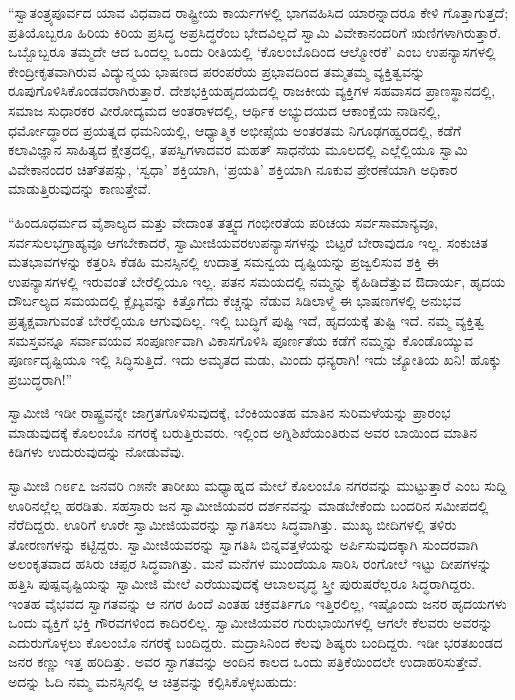  “ಸ್ವಾತಂತ್ರ್ಯಪೂರ್ವದ ಯಾವ ವಿಧವಾದ ರಾಷ್ಟ್ರೀಯ ಕಾರ್ಯಗಳಲ್ಲಿ ಭಾಗವಹಿಸಿದ ಯಾರನ್ನಾದರೂ ಕೇಳಿ ಗೊತ್ತಾಗುತ್ತದೆ; ಪ್ರತಿಯೊಬ್ಬರೂ ಹಿರಿಯ ಕಿರಿಯ ಪ್ರಸಿದ್ಧ ಅಪ್ರಸಿದ್ಧರೆಂಬ ಭೇದವಿಲ್ಲದೆ ಸ್ವಾಮಿ ವಿವೇಕಾನಂದರಿಗೆ ಋಣಿಗಳಾಗಿರುತ್ತಾರೆ. ಒಬ್ಬೊಬ್ಬರೂ ತಮ್ಮದೇ ಆದ ಒಂದಲ್ಲ ಒಂದು ರೀತಿಯಲ್ಲಿ ‘ಕೊಲಂಬೊದಿಂದ ಆಲ್ಮೋರಕೆ’ ಎಂಬ ಉಪನ್ಯಾಸಗಳಲ್ಲಿ ಕೇಂದ್ರೀಕೃತವಾಗಿರುವ ವಿದ್ಯುನ್ಮಯ ಭಾಷಣದ ಪರಂಪರೆಯ ಪ್ರಭಾವದಿಂದ ತಮ್ಮತಮ್ಮ ವ್ಯಕ್ತಿತ್ವವನ್ನು ರೂಪುಗೊಳಿಸಿಕೊಂಡವರಾಗಿರುತ್ತಾರೆ. ದೇಶಭಕ್ತಿಯ\break ಹೃದಯದಲ್ಲಿ ರಾಜಕೀಯ ವ್ಯಕ್ತಿಗಳ ಸಹವಾಸದ ಪ್ರಾಣಸ್ಥಾನದಲ್ಲಿ, ಸಮಾಜ ಸುಧಾರಕರ ವೀರೋದ್ಯಮದ ಅಂತರಾಳದಲ್ಲಿ, ಆರ್ಥಿಕ ಅಭ್ಯುದಯದ ಆಕಾಂಕ್ಷೆಯ ನಾಡಿನಲ್ಲಿ, ಧರ್ಮೋದ್ಧಾರದ ಪ್ರಯತ್ನದ ಧಮನಿಯಲ್ಲಿ, ಆಧ್ಯಾತ್ಮಿಕ ಅಭೀಪ್ಸೆಯ ಅಂತರತಮ ನಿಗೂಢಗಹ್ವರದಲ್ಲಿ, ಕಡೆಗೆ ಕಲಾವಿಜ್ಞಾನ ಸಾಹಿತ್ಯದ ಕ್ಷೇತ್ರದಲ್ಲಿ, ತಪಸ್ವಿಗಳಾದವರ ಮಹತ್ ಸಾಧನೆಯ ಮೂಲದಲ್ಲಿ ಎಲ್ಲೆಲ್ಲಿಯೂ ಸ್ವಾಮಿ ವಿವೇಕಾನಂದರ ಚಿತ್‍ತಪಸ್ಸು, ‘ಸ್ವಧಾ’ ಶಕ್ತಿಯಾಗಿ, ‘ಪ್ರಯತಿ’ ಶಕ್ತಿಯಾಗಿ ನೂಕುವ ಪ್ರೇರಣೆಯಾಗಿ ಅಧಿಕಾರ ಮಾಡುತ್ತಿರುವುದನ್ನು ಕಾಣುತ್ತೇವೆ. 

 “ಹಿಂದೂಧರ್ಮದ ವೈಶಾಲ್ಯದ ಮತ್ತು ವೇದಾಂತ ತತ್ತ್ವದ ಗಂಭೀರತೆಯ ಪರಿಚಯ ಸರ್ವಸಾಮಾನ್ಯವೂ, ಸರ್ವಸುಲಭಗ್ರಾಹ್ಯವೂ ಆಗಬೇಕಾದರೆ, ಸ್ವಾಮೀಜಿಯವರ\break ಉಪನ್ಯಾಸಗಳನ್ನು ಬಿಟ್ಟರೆ ಬೇರಾವುದೂ ಇಲ್ಲ. ಸಂಕುಚಿತ ಮತಭಾವಗಳನ್ನು ಕತ್ತರಿಸಿ ಕೆಡಹಿ ಮನಸ್ಸಿನಲ್ಲಿ ಉದಾತ್ತ ಸಮನ್ವಯ ದೃಷ್ಟಿಯನ್ನು ಪ್ರಜ್ವಲಿಸುವ ಶಕ್ತಿ ಈ ಉಪನ್ಯಾಸಗಳಲ್ಲಿ ಇರುವಂತೆ ಬೇರೆಲ್ಲಿಯೂ ಇಲ್ಲ. ಪತನ ಸಮಯದಲ್ಲಿ ನಮ್ಮನ್ನು ಕೈಹಿಡಿದೆತ್ತುವ ಔದಾರ್ಯ, ಹೃದಯ ದೌರ್ಬಲ್ಯದ ಸಮಯದಲ್ಲಿ ಕ್ಲೈಬ್ಯವನ್ನು ಕಿತ್ತೊಗೆದು ಕೆಚ್ಚನ್ನು ನೆಡುವ ಸಿಡಿಲಾಳ್ಮೆ ಈ ಭಾಷಣಗಳಲ್ಲಿ ಅನುಭವ ಪ್ರತ್ಯಕ್ಷವಾಗುವಂತೆ ಬೇರೆಲ್ಲಿಯೂ ಆಗುವುದಿಲ್ಲ. ಇಲ್ಲಿ ಬುದ್ಧಿಗೆ ಪುಷ್ಟಿ ಇದೆ, ಹೃದಯಕ್ಕೆ ತುಷ್ಟಿ ಇದೆ. ನಮ್ಮ ವ್ಯಕ್ತಿತ್ವ ಸಮಸ್ತವನ್ನೂ ಸರ್ವಾವಯವ ಸಂಪೂರ್ಣವಾಗಿ ವಿಕಾಸಗೊಳಿಸಿ ಪೂರ್ಣತೆಯ ಕಡೆಗೆ ನಮ್ಮನ್ನು ಕೊಂಡೊಯ್ಯುವ ಪೂರ್ಣದೃಷ್ಟಿಯೂ ಇಲ್ಲಿ ಸಿದ್ಧಿಸುತ್ತಿದೆ. ಇದು ಅಮೃತದ ಮಡು, ಮಿಂದು ಧನ್ಯರಾಗಿ! ಇದು ಜ್ಯೋತಿಯ ಖನಿ! ಹೊಕ್ಕು ಪ್ರಬುದ್ಧರಾಗಿ!” 

 ಸ್ವಾಮೀಜಿ ಇಡೀ ರಾಷ್ಟ್ರವನ್ನೇ ಜಾಗ್ರತಗೊಳಿಸುವುದಕ್ಕೆ, ಬೆಂಕಿಯಂತಹ ಮಾತಿನ ಸುರಿಮಳೆಯನ್ನು ಪ್ರಾರಂಭ ಮಾಡುವುದಕ್ಕೆ ಕೊಲಂಬೊ ನಗರಕ್ಕೆ ಬರುತ್ತಿರುವರು. ಇಲ್ಲಿಂದ ಅಗ್ನಿಶಿಖೆಯಂತಿರುವ ಅವರ ಬಾಯಿಂದ ಮಾತಿನ ಕಿಡಿಗಳು ಉದುರುವುದನ್ನು ನೋಡುವೆವು. 

 ಸ್ವಾಮೀಜಿ ೧೮೯೭ ಜನವರಿ ೧೫ನೇ ತಾರೀಖು ಮಧ್ಯಾಹ್ನದ ಮೇಲೆ ಕೊಲಂಬೊ ನಗರವನ್ನು ಮುಟ್ಟುತ್ತಾರೆ ಎಂಬ ಸುದ್ದಿ ಊರಿನಲ್ಲೆಲ್ಲ ಹರಡಿತು. ಸಹಸ್ರಾರು ಜನ ಸ್ವಾಮೀಜಿಯವರ ದರ್ಶನವನ್ನು ಮಾಡಬೇಕೆಂದು ಬಂದರಿನ ಸಮೀಪದಲ್ಲಿ ನೆರೆದಿದ್ದರು. ಊರಿಗೆ ಊರೇ ಸ್ವಾಮೀಜಿಯವರನ್ನು ಸ್ವಾಗತಿಸಲು ಸಿದ್ಧವಾಗಿತ್ತು. ಮುಖ್ಯ ಬೀದಿಗಳಲ್ಲಿ ತಳಿರು ತೋರಣಗಳನ್ನು ಕಟ್ಟಿದ್ದರು. ಸ್ವಾಮೀಜಿಯವರನ್ನು ಸ್ವಾಗತಿಸಿ ಬಿನ್ನವತ್ತಳೆಯನ್ನು ಅರ್ಪಿಸುವುದಕ್ಕಾಗಿ ಸುಂದರವಾಗಿ ಅಲಂಕೃತವಾದ ಹಸಿರು ಚಪ್ಪರ ಸಿದ್ಧವಾಗಿತ್ತು. ಮನೆ ಮನೆಗಳ ಮುಂದೆಯೂ ಸಾರಿಸಿ ರಂಗೋಲೆ ಇಟ್ಟು ದೀಪಗಳನ್ನು ಹತ್ತಿಸಿ ಪುಷ್ಪವೃಷ್ಟಿಯನ್ನು ಸ್ವಾಮೀಜಿ ಮೇಲೆ ಎರೆಯುವುದಕ್ಕೆ ಆಬಾಲವೃದ್ಧ ಸ್ತ್ರೀ ಪುರುಷರೆಲ್ಲರೂ ಸಿದ್ಧರಾಗಿದ್ದರು. ಇಂತಹ ವೈಭವದ ಸ್ವಾಗತವನ್ನು ಆ ನಗರ ಹಿಂದೆ ಎಂತಹ ಚಕ್ರವರ್ತಿಗೂ ಇತ್ತಿರಲಿಲ್ಲ, ಇಷ್ಟೊಂದು ಜನರ ಹೃದಯಗಳು ಒಂದು ವ್ಯಕ್ತಿಗೆ ಭಕ್ತಿ ಗೌರವಗಳಿಂದ ಕಾದಿರಲಿಲ್ಲ. ಸ್ವಾಮೀಜಿಯವರ ಗುರುಭಾಯಿಗಳಲ್ಲಿ ಆಗಲೇ ಕೆಲವರು ಅವರನ್ನು ಎದುರುಗೊಳ್ಳಲು ಕೊಲಂಬೊ ನಗರಕ್ಕೆ ಬಂದಿದ್ದರು. ಮದ್ರಾಸಿನಿಂದ ಕೆಲವು ಶಿಷ್ಯರು ಬಂದಿದ್ದರು. ಇಡೀ ಭರತಖಂಡದ ಜನರ ಕಣ್ಣು ಇತ್ತ ಹರಿದಿತ್ತು. ಅವರ ಸ್ವಾಗತವನ್ನು ಅಂದಿನ ಕಾಲದ ಒಂದು ಪತ್ರಿಕೆಯಿಂದಲೇ ಉದಾಹರಿಸುತ್ತೇವೆ. ಅದನ್ನು ಓದಿ ನಮ್ಮ ಮನಸ್ಸಿನಲ್ಲಿ ಆ ಚಿತ್ರವನ್ನು ಕಲ್ಪಿಸಿಕೊಳ್ಳಬಹುದು: 

